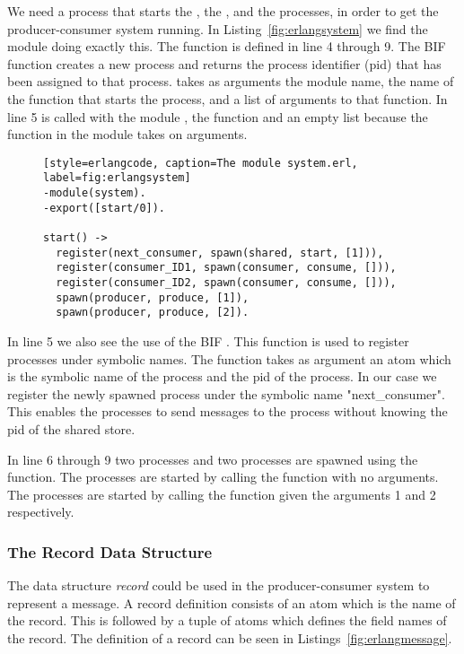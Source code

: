 We need a process that starts the , the , and the  processes, in order to get the producer-consumer system running. In Listing~\ref{fig:erlangsystem} we find the  module doing exactly this. The  function is defined in line 4 through 9. The BIF function  creates a new process and returns the process identifier (pid) that has been assigned to that process.  takes as arguments the module name, the name of the function that starts the process, and a list of arguments to that function. In line 5  is called with the module , the function  and an empty list because the function  in the module  takes on arguments.

\begin{figure}[h!]
\begin{verbatim}[style=erlangcode, caption=The module system.erl, label=fig:erlangsystem]
-module(system).
-export([start/0]).

start() ->
  register(next_consumer, spawn(shared, start, [1])),
  register(consumer_ID1, spawn(consumer, consume, [])),
  register(consumer_ID2, spawn(consumer, consume, [])),
  spawn(producer, produce, [1]),
  spawn(producer, produce, [2]).
\end{verbatim}
\end{figure}

In line 5 we also see the use of the BIF . This function is used to register processes under symbolic names. The function takes as argument an atom which is the symbolic name of the process and the pid of the process. In our case we register the newly spawned  process under the symbolic name "next\_consumer". This enables the  processes to send messages to the  process without knowing the pid of the shared store.

In line 6 through 9 two  processes and two  processes are spawned using the  function. The  processes are started by calling the function  with no arguments. The  processes are started by calling the function  given the arguments 1 and 2 respectively.

\subsubsection{The Record Data Structure}
The data structure \emph{record} could be used in the producer-consumer system to represent a message. A record definition consists of an atom which is the name of the record. This is followed by a tuple of atoms which defines the field names of the record. The definition of a  record can be seen in Listings~\ref{fig:erlangmessage}.

